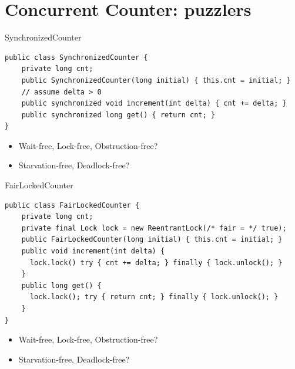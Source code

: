 \section{Concurrent Counter: puzzlers}
\showTOC

\begin{frame}[t,fragile]{SynchronizedCounter}

\begin{verbatim}
public class SynchronizedCounter {
    private long cnt;
    public SynchronizedCounter(long initial) { this.cnt = initial; }
    // assume delta > 0
    public synchronized void increment(int delta) { cnt += delta; }
    public synchronized long get() { return cnt; }
}
\end{verbatim}

\begin{itemize}  
  \item Wait-free, Lock-free, Obstruction-free?
  \item Starvation-free, Deadlock-free?
\end{itemize}

\end{frame}

\begin{frame}{FairLockedCounter}

\begin{verbatim}
public class FairLockedCounter {
    private long cnt;
    private final Lock lock = new ReentrantLock(/* fair = */ true); 
    public FairLockedCounter(long initial) { this.cnt = initial; }
    public void increment(int delta) { 
      lock.lock() try { cnt += delta; } finally { lock.unlock(); } 
    }
    public long get() { 
      lock.lock(); try { return cnt; } finally { lock.unlock(); }
    }
}
\end{verbatim}

\begin{itemize}  
  \item Wait-free, Lock-free, Obstruction-free?
  \item Starvation-free, Deadlock-free?
\end{itemize}

\end{frame}



